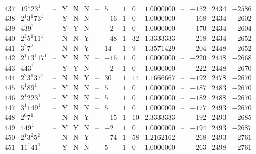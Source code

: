 \documentclass[11pt,reqno,a4letter]{article}
\numberwithin{figure}{section}
\numberwithin{table}{section}
\theoremstyle{plain}
\numberwithin{theorem}{section}
\theoremstyle{definition}
\begin{document}
\begin{table}[h!]
\begin{equation*}
{\begin{array}{|cc|c|ccc|c|c|ccc|c|ccc}
 437 & 19^1 23^1 & \text{--} & \text{Y} & \text{N} & \text{N} & \text{--} & 5 & 1 & 0 & 1.0000000 & \text{--} & -152 & 2434 & -2586 \\
 438 & 2^1 3^1 73^1 & \text{--} & \text{Y} & \text{N} & \text{N} & \text{--} & -16 & 1 & 0 & 1.0000000 & \text{--} & -168 & 2434 & -2602 \\
 439 & 439^1 & \text{--} & \text{Y} & \text{Y} & \text{N} & \text{--} & -2 & 1 & 0 & 1.0000000 & \text{--} & -170 & 2434 & -2604 \\
 440 & 2^3 5^1 11^1 & \text{--} & \text{N} & \text{N} & \text{Y} & \text{--} & -48 & 1 & 32 & 1.3333333 & \text{--} & -218 & 2434 & -2652 \\
 441 & 3^2 7^2 & \text{--} & \text{N} & \text{N} & \text{Y} & \text{--} & 14 & 1 & 9 & 1.3571429 & \text{--} & -204 & 2448 & -2652 \\
 442 & 2^1 13^1 17^1 & \text{--} & \text{Y} & \text{N} & \text{N} & \text{--} & -16 & 1 & 0 & 1.0000000 & \text{--} & -220 & 2448 & -2668 \\
 443 & 443^1 & \text{--} & \text{Y} & \text{Y} & \text{N} & \text{--} & -2 & 1 & 0 & 1.0000000 & \text{--} & -222 & 2448 & -2670 \\
 444 & 2^2 3^1 37^1 & \text{--} & \text{N} & \text{N} & \text{Y} & \text{--} & 30 & 1 & 14 & 1.1666667 & \text{--} & -192 & 2478 & -2670 \\
 445 & 5^1 89^1 & \text{--} & \text{Y} & \text{N} & \text{N} & \text{--} & 5 & 1 & 0 & 1.0000000 & \text{--} & -187 & 2483 & -2670 \\
 446 & 2^1 223^1 & \text{--} & \text{Y} & \text{N} & \text{N} & \text{--} & 5 & 1 & 0 & 1.0000000 & \text{--} & -182 & 2488 & -2670 \\
 447 & 3^1 149^1 & \text{--} & \text{Y} & \text{N} & \text{N} & \text{--} & 5 & 1 & 0 & 1.0000000 & \text{--} & -177 & 2493 & -2670 \\
 448 & 2^6 7^1 & \text{--} & \text{N} & \text{N} & \text{Y} & \text{--} & -15 & 1 & 10 & 2.3333333 & \text{--} & -192 & 2493 & -2685 \\
 449 & 449^1 & \text{--} & \text{Y} & \text{Y} & \text{N} & \text{--} & -2 & 1 & 0 & 1.0000000 & \text{--} & -194 & 2493 & -2687 \\
 450 & 2^1 3^2 5^2 & \text{--} & \text{N} & \text{N} & \text{Y} & \text{--} & -74 & 1 & 58 & 1.2162162 & \text{--} & -268 & 2493 & -2761 \\
 451 & 11^1 41^1 & \text{--} & \text{Y} & \text{N} & \text{N} & \text{--} & 5 & 1 & 0 & 1.0000000 & \text{--} & -263 & 2498 & -2761 \\

\end{array}}
\end{equation*}
\end{table}
\end{document}
